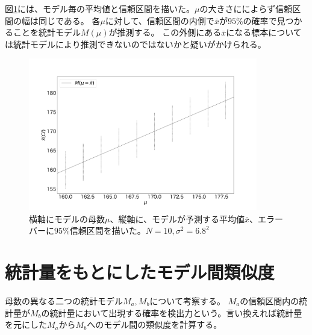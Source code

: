 図\ref{fig:confidence_interval_model}には、モデル毎の平均値と信頼区間を描いた。$\mu$の大きさにによらず信頼区間の幅は同じである。
各$\mu$に対して、信頼区間の内側で$\bar{x}$が$95\%$の確率で見つかることを統計モデル$M(\mu)$が推測する。
この外側にある$\bar{x}$になる標本については統計モデルにより推測できないのではないかと疑いがかけられる。

\begin{figure}
    \begin{center}
        \includegraphics[width=10cm]{./image/04_/confidence_interval_model.pdf}
        \caption{横軸にモデルの母数$\mu$、縦軸に、モデルが予測する平均値$\bar{x}$、エラーバーに$95\%$信頼区間を描いた。$N=10,\sigma^2=6.8^2$}
        \label{fig:confidence_interval_model}

      \end{center}
    \end{figure}



\section{統計量をもとにしたモデル間類似度}
母数の異なる二つの統計モデル$M_a,M_b$について考察する。
$M_a$の信頼区間内の統計量が$M_b$の統計量において出現する確率を検出力という。言い換えれば統計量を元にした$M_a$から$M_b$へのモデル間の類似度を計算する。

